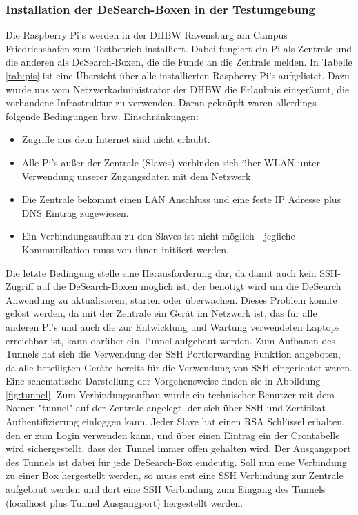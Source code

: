 \subsubsection{Installation der DeSearch-Boxen in der Testumgebung}
Die Raspberry Pi's werden in der DHBW Ravensburg am Campus Friedrichshafen zum Testbetrieb installiert. Dabei fungiert ein Pi als Zentrale und die anderen als DeSearch-Boxen, die die Funde an die Zentrale melden. In Tabelle \ref{tab:pis} ist eine Übersicht über alle installierten Raspberry Pi's aufgelistet.
Dazu wurde uns vom Netzwerkadministrator der DHBW die Erlaubnis eingeräumt, die vorhandene Infrastruktur zu verwenden. Daran geknüpft waren allerdings folgende Bedingungen bzw. Einschränkungen:
\begin{itemize}
	\item Zugriffe aus dem Internet sind nicht erlaubt.
	\item Alle Pi's außer der Zentrale (Slaves) verbinden sich über WLAN unter Verwendung unserer Zugangsdaten mit dem Netzwerk.
	\item Die Zentrale bekommt einen LAN Anschluss und eine feste IP Adresse plus DNS Eintrag zugewiesen.
	\item Ein Verbindungsaufbau zu den Slaves ist nicht möglich - jegliche Kommunikation muss von ihnen initiiert werden.
\end{itemize}
Die letzte Bedingung stelle eine Herausforderung dar, da damit auch kein SSH-Zugriff auf die DeSearch-Boxen möglich ist, der benötigt wird um die DeSearch Anwendung zu aktualisieren, starten oder überwachen.
Dieses Problem konnte gelöst werden, da mit der Zentrale ein Gerät im Netzwerk ist, das für alle anderen Pi's und auch die zur Entwicklung und Wartung verwendeten Laptops erreichbar ist, kann darüber ein Tunnel aufgebaut werden.
Zum Aufbauen des Tunnels hat sich die Verwendung der SSH Portforwarding Funktion angeboten, da alle beteiligten Geräte bereits für die Verwendung von SSH eingerichtet waren. Eine schematische Darstellung der Vorgehensweise finden sie in Abbildung \ref{fig:tunnel}.
Zum Verbindungsaufbau wurde ein technischer Benutzer mit dem Namen "tunnel" auf der Zentrale angelegt, der sich über SSH und Zertifikat Authentifizierung einloggen kann.
Jeder Slave hat einen RSA Schlüssel erhalten, den er zum Login verwenden kann, und über einen Eintrag ein der Crontabelle wird sichergestellt, dass der Tunnel immer offen gehalten wird.
Der Ausgangsport des Tunnels ist dabei für jede DeSearch-Box eindeutig. Soll nun eine Verbindung zu einer Box hergestellt werden, so muss erst eine SSH Verbindung zur Zentrale aufgebaut werden und dort eine SSH Verbindung zum Eingang des Tunnels (localhost plus Tunnel Ausgangport) hergestellt werden.
